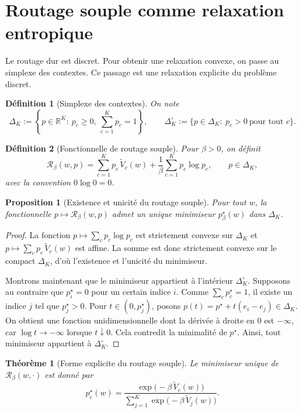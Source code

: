 \documentclass[11pt,a4paper]{article}
\newtheorem{definition}{Définition}[section]
\newtheorem{proposition}{Proposition}[section]
\newtheorem{theorem}{Théorème}[section]
\newcommand{\R}{\mathbb R}
\newcommand{\Rcal}{\mathcal R}
\begin{document}
\section{Routage souple comme relaxation entropique}

Le routage dur est discret. Pour obtenir une relaxation convexe, on passe au simplexe des contextes. Ce passage est une relaxation explicite du problème discret.

\begin{definition}[Simplexe des contextes]
On note
\[
\Delta_K:=\left\{p\in\R^K:\ p_c\ge 0,\ \sum_{c=1}^K p_c=1\right\},
\qquad
\Delta_K^\circ:=\{p\in\Delta_K:\ p_c>0\ \text{pour tout }c\}.
\]
\end{definition}

\begin{definition}[Fonctionnelle de routage souple]
Pour \(\beta>0\), on définit
\[
\Rcal_\beta(w,p)
=
\sum_{c=1}^K p_c\,\widetilde V_c(w)
+\frac{1}{\beta}\sum_{c=1}^K p_c\log p_c,
\qquad p\in\Delta_K,
\]
avec la convention \(0\log 0=0\).
\end{definition}

\begin{proposition}[Existence et unicité du routage souple]
Pour tout \(w\), la fonctionnelle \(p\mapsto \Rcal_\beta(w,p)\) admet un unique minimiseur \(p^\star_\beta(w)\) dans \(\Delta_K\).
\end{proposition}

\begin{proof}
La fonction \(p\mapsto \sum_c p_c\log p_c\) est strictement convexe sur \(\Delta_K\) et \(p\mapsto \sum_c p_c\,\widetilde V_c(w)\) est affine. La somme est donc strictement convexe sur le compact \(\Delta_K\), d'où l'existence et l'unicité du minimiseur.

Montrons maintenant que le minimiseur appartient à l'intérieur \(\Delta_K^\circ\). Supposons au contraire que \(p^\star_i=0\) pour un certain indice \(i\). Comme \(\sum_c p^\star_c=1\), il existe un indice \(j\) tel que \(p^\star_j>0\). Pour \(t\in(0,p^\star_j)\), posons \(p(t)=p^\star+t(e_i-e_j)\in\Delta_K\). On obtient une fonction unidimensionnelle dont la dérivée à droite en 0 est \(-\infty\), car \(\log t\to-\infty\) lorsque \(t\downarrow0\). Cela contredit la minimalité de \(p^\star\). Ainsi, tout minimiseur appartient à \(\Delta_K^\circ\).
\end{proof}

\begin{theorem}[Forme explicite du routage souple]
Le minimiseur unique de \(\Rcal_\beta(w,\cdot)\) est donné par
\[
p_c^\star(w)=\frac{\exp\!\bigl(-\beta\,\widetilde V_c(w)\bigr)}
{\sum_{j=1}^K \exp\!\bigl(-\beta\,\widetilde V_j(w)\bigr)}.
\]
\end{theorem}
\end{document}
